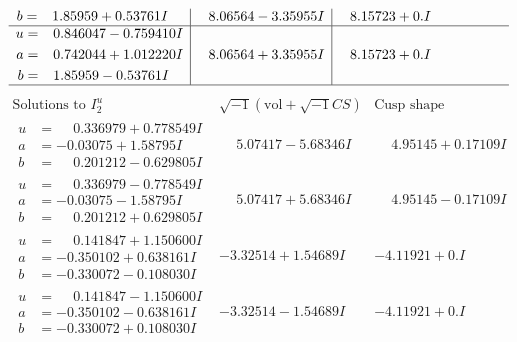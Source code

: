 \documentclass[1p]{elsarticle_modified}
\theoremstyle{definition}
\newcommand{\I}{\sqrt{-1}}
\begin{document}
$$\begin{array}{c|c|c}
\begin{aligned}
b &= \phantom{-}1.85959 + 0.53761 I\end{aligned}
 & \phantom{-}8.06564 - 3.35955 I & \phantom{-}8.15723 + 0. I\phantom{ +0.000000I} \\ \hline\begin{aligned}
u &= \phantom{-}0.846047 - 0.759410 I \\
a &= \phantom{-}0.742044 + 1.012220 I \\
b &= \phantom{-}1.85959 - 0.53761 I\end{aligned}
 & \phantom{-}8.06564 + 3.35955 I & \phantom{-}8.15723 + 0. I\phantom{ +0.000000I}\\
 \hline 
 \end{array}$$\newpage$$\begin{array}{c|c|c}  
\text{Solutions to }I^u_{2}& \I (\text{vol} + \sqrt{-1}CS) & \text{Cusp shape}\\
 \hline 
\begin{aligned}
u &= \phantom{-}0.336979 + 0.778549 I \\
a &= -0.03075 + 1.58795 I \\
b &= \phantom{-}0.201212 - 0.629805 I\end{aligned}
 & \phantom{-}5.07417 - 5.68346 I & \phantom{-}4.95145 + 0.17109 I \\ \hline\begin{aligned}
u &= \phantom{-}0.336979 - 0.778549 I \\
a &= -0.03075 - 1.58795 I \\
b &= \phantom{-}0.201212 + 0.629805 I\end{aligned}
 & \phantom{-}5.07417 + 5.68346 I & \phantom{-}4.95145 - 0.17109 I \\ \hline\begin{aligned}
u &= \phantom{-}0.141847 + 1.150600 I \\
a &= -0.350102 + 0.638161 I \\
b &= -0.330072 - 0.108030 I\end{aligned}
 & -3.32514 + 1.54689 I & -4.11921 + 0. I\phantom{ +0.000000I} \\ \hline\begin{aligned}
u &= \phantom{-}0.141847 - 1.150600 I \\
a &= -0.350102 - 0.638161 I \\
b &= -0.330072 + 0.108030 I\end{aligned}
 & -3.32514 - 1.54689 I & -4.11921 + 0. I\phantom{ +0.000000I} \\ \hline\begin{aligned}

\end{aligned}
\end{array}$$
\end{document}
